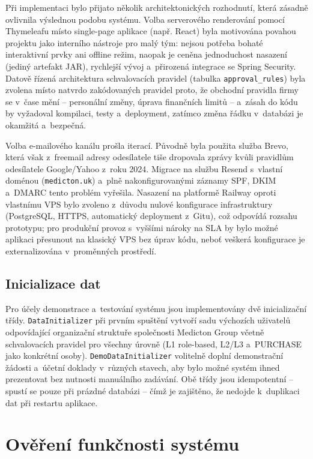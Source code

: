 Při implementaci bylo přijato několik architektonických rozhodnutí,
která zásadně ovlivnila výslednou podobu systému. Volba serverového
renderování pomocí Thymeleafu místo single-page aplikace (např. React)
byla motivována povahou projektu jako interního nástroje pro malý tým:
nejsou potřeba bohaté interaktivní prvky ani offline režim, naopak je
ceněna jednoduchost nasazení (jediný artefakt JAR), rychlejší vývoj
a~přirozená integrace se Spring Security. Datově řízená architektura
schvalovacích pravidel (tabulka \texttt{approval\_rules}) byla zvolena
místo natvrdo zakódovaných pravidel proto, že obchodní pravidla
firmy se v~čase mění -- personální změny, úprava finančních limitů --
a~zásah do kódu by vyžadoval kompilaci, testy a~deployment, zatímco
změna řádku v~databázi je okamžitá a~bezpečná.

Volba e-mailového kanálu prošla iterací. Původně byla použita služba
Brevo, která však z~freemail adresy odesílatele tiše dropovala
zprávy kvůli pravidlům odesílatele Google/Yahoo z~roku 2024.
Migrace na službu Resend s~vlastní doménou (\texttt{medicton.uk})
a~plně nakonfigurovanými záznamy SPF, DKIM a~DMARC tento problém
vyřešila. Nasazení na platformě Railway oproti vlastnímu VPS bylo
zvoleno z~důvodu nulové konfigurace infrastruktury (PostgreSQL,
HTTPS, automatický deployment z~Gitu), což odpovídá rozsahu
prototypu; pro produkční provoz s~vyššími nároky na SLA by bylo
možné aplikaci přesunout na klasický VPS bez úprav kódu, neboť
veškerá konfigurace je externalizována v~proměnných prostředí.


\section{Inicializace dat}

Pro účely demonstrace a~testování systému jsou implementovány dvě
inicializační třídy. \texttt{DataInitializer} při prvním spuštění
vytvoří sadu výchozích uživatelů odpovídající organizační struktuře
společnosti Medicton Group včetně schvalovacích pravidel pro všechny
úrovně (L1 role-based, L2/L3 a~PURCHASE jako konkrétní osoby).
\texttt{DemoDataInitializer} volitelně doplní demonstrační žádosti
a~účetní doklady v~různých stavech, aby bylo možné systém ihned
prezentovat bez nutnosti manuálního zadávání. Obě třídy jsou
idempotentní -- spustí se pouze při prázdné databázi -- čímž je
zajištěno, že nedojde k~duplikaci dat při restartu aplikace.


\chapter{Ověření funkčnosti systému}

